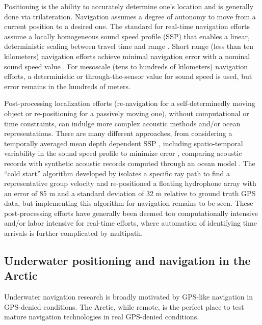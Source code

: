 Positioning is the ability to accurately determine one's location and is generally done via trilateration.
Navigation assumes a degree of autonomy to move from a current position to a desired one.
The standard for real-time navigation efforts assume a locally homogeneous sound speed profile (SSP) that enables a linear, deterministic scaling between travel time and range \citep{eustice_recent_2006,eustice_experimental_2007,webster_preliminary_2009,webster_advances_2012}.
Short range (less than ten kilometers) navigation efforts achieve minimal navigation error with a nominal sound speed value \citep{eustice_experimental_2007,webster_preliminary_2009,kepper_mems_2017}.
For mesoscale (tens to hundreds of kilometers) navigation efforts, a deterministic \citep{graupe_preliminary_2019} or through-the-sensor \citep{webster_towards_2015} value for sound speed is used, but error remains in the hundreds of meters.

Post-processing localization efforts (re-navigation for a self-determinedly moving object or re-positioning for a passively moving one), without computational or time constraints, can indulge more complex acoustic methods and/or ocean representations.
There are many different approaches, from considering a temporally averaged mean depth dependent SSP \citep{van_uffelen_localization_2016}, including spatio-temporal variability in the sound speed profile to minimize error \citep{graupe_preliminary_2019, mikhalevsky_deep_2020}, comparing acoustic records with synthetic acoustic records computed through an ocean model \citep{wu_deep_2019}. 
The ``cold start'' algorithm developed by \citet{mikhalevsky_deep_2020} isolates a specific ray path to find a representative group velocity \citep{mikhalevsky_deep_2020} and re-positioned a floating hydrophone array with an error of 85 m and a standard deviation of 32 m relative to ground truth GPS data, but implementing this algorithm for navigation remains to be seen.
These post-processing efforts have generally been deemed too computationally intensive and/or labor intensive for real-time efforts, where automation of identifying time arrivals is further complicated by multipath. 

\subsection{Underwater positioning and navigation in the Arctic}

Underwater navigation research is broadly motivated by GPS-like navigation in GPS-denied conditions.
The Arctic, while remote, is the perfect place to test mature navigation technologies in real GPS-denied conditions.

